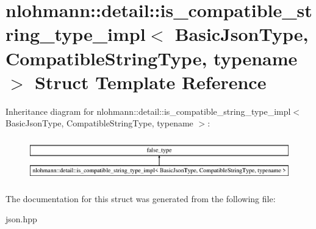 \hypertarget{structnlohmann_1_1detail_1_1is__compatible__string__type__impl}{}\section{nlohmann\+:\+:detail\+:\+:is\+\_\+compatible\+\_\+string\+\_\+type\+\_\+impl$<$ Basic\+Json\+Type, Compatible\+String\+Type, typename $>$ Struct Template Reference}
\label{structnlohmann_1_1detail_1_1is__compatible__string__type__impl}
Inheritance diagram for nlohmann\+:\+:detail\+:\+:is\+\_\+compatible\+\_\+string\+\_\+type\+\_\+impl$<$ Basic\+Json\+Type, Compatible\+String\+Type, typename $>$\+:\begin{figure}[H]
\begin{center}
\leavevmode
\includegraphics[height=1.882353cm]{structnlohmann_1_1detail_1_1is__compatible__string__type__impl}
\end{center}
\end{figure}


The documentation for this struct was generated from the following file\+:\begin{DoxyCompactItemize}
\item 
json.\+hpp\end{DoxyCompactItemize}
